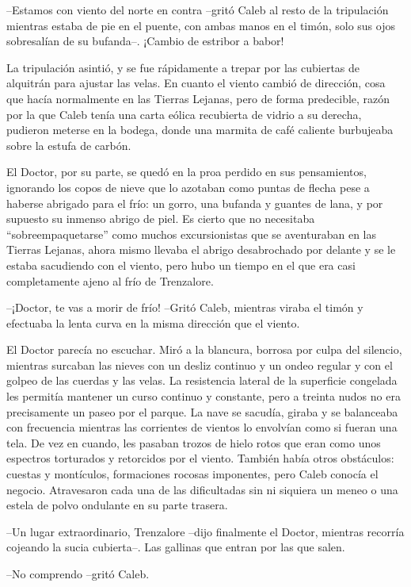 --Estamos con viento del norte en contra --gritó Caleb al resto de la tripulación mientras estaba de pie en el puente, con ambas manos en el timón, solo sus ojos sobresalían de su bufanda--. ¡Cambio de estribor a babor!
 
La tripulación asintió, y se fue rápidamente a trepar por las cubiertas de alquitrán para ajustar las velas. En cuanto el viento cambió de dirección, cosa que hacía normalmente en las Tierras Lejanas, pero de forma predecible, razón por la que Caleb tenía una carta eólica recubierta de vidrio a su derecha, pudieron meterse en la bodega, donde una marmita de café caliente burbujeaba sobre la estufa de carbón.
 
El Doctor, por su parte, se quedó en la proa perdido en sus pensamientos, ignorando los copos de nieve que lo azotaban como puntas de flecha pese a  haberse abrigado para el frío: un gorro, una bufanda y guantes de lana, y por supuesto su inmenso abrigo de piel. Es cierto que no necesitaba ``sobreempaquetarse'' como muchos excursionistas que se aventuraban en las Tierras Lejanas, ahora mismo llevaba el abrigo desabrochado por delante y se le estaba sacudiendo con el viento, pero hubo un tiempo en el que era casi completamente ajeno al frío de Trenzalore.
 
--¡Doctor, te vas a morir de frío! --Gritó Caleb, mientras viraba el timón y efectuaba la lenta curva en la misma dirección que el viento.
 
El Doctor parecía no escuchar. Miró a la blancura, borrosa por culpa del silencio, mientras surcaban las nieves con un desliz continuo y un ondeo regular y con el golpeo de las cuerdas y las velas. La resistencia lateral de la superficie congelada les permitía mantener un curso continuo y constante, pero a treinta nudos no era precisamente un paseo por el parque. La nave se sacudía, giraba y se balanceaba con frecuencia mientras las corrientes de vientos lo envolvían como si fueran una tela. De vez en cuando, les pasaban trozos de hielo rotos que eran como unos espectros torturados y retorcidos por el viento. También había otros obstáculos: cuestas y montículos, formaciones rocosas imponentes, pero Caleb conocía el negocio. Atravesaron cada una de las dificultadas sin ni siquiera un meneo o una estela de polvo ondulante en su parte trasera.
 
--Un lugar extraordinario, Trenzalore --dijo finalmente el Doctor, mientras recorría cojeando la sucia cubierta--. Las gallinas que entran por las que salen.
 
--No comprendo --gritó Caleb.
 
